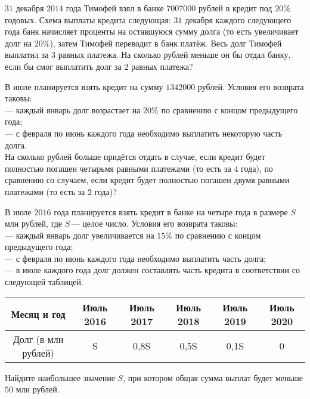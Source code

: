 \begin{homework}[number=3]
	\begin{listofex}
		\item \( 31 \) декабря \( 2014 \) года Тимофей взял в банке \( 7 007 000  \) рублей в кредит под \( 20\% \) годовых. Схема выплаты кредита следующая: \( 31 \) декабря каждого следующего года банк начисляет проценты на оставшуюся сумму долга (то есть увеличивает долг на \( 20\% \)), затем Тимофей переводит в банк платёж. Весь долг Тимофей выплатил за \( 3 \) равных платежа. На сколько рублей меньше он бы отдал банку, если бы смог выплатить долг за \( 2 \) равных платежа?
		\item В июле планируется взять кредит на сумму \( 1 342 000 \) рублей. Условия его возврата таковы:\\
		--- каждый январь долг возрастает на \( 20\% \) по сравнению с концом предыдущего года;\\		
		--- с февраля по июнь каждого года необходимо выплатить некоторую часть долга.\\		
		На сколько рублей больше придётся отдать в случае, если кредит будет полностью погашен четырьмя равными платежами (то есть за \( 4 \) года), по сравнению со случаем, если кредит будет полностью погашен двумя равными платежами (то есть за \( 2 \) года)?
		\item В июле \( 2016 \) года планируется взять кредит в банке на четыре года в размере \( S \) млн рублей, где \( S \) --- целое число. Условия его возврата таковы:\\		
		--- каждый январь долг увеличивается на \( 15\% \) по сравнению с концом предыдущего года;\\		
		--- с февраля по июнь каждого года необходимо выплатить часть долга;\\		
		--- в июле каждого года долг должен составлять часть кредита в соответствии со следующей таблицей.
		\begin{table}[h]
			\begin{tabular}{llllll}
				\hline
				\multicolumn{1}{|c|}{Месяц и год}         & \multicolumn{1}{c|}{Июль 2016} & \multicolumn{1}{c|}{Июль 2017} & \multicolumn{1}{c|}{Июль 2018} & \multicolumn{1}{c|}{Июль 2019} & \multicolumn{1}{c|}{Июль 2020} \\ \hline
				\multicolumn{1}{|c|}{Долг (в млн рублей)} & \multicolumn{1}{c|}{S}         & \multicolumn{1}{c|}{0,8S}      & \multicolumn{1}{c|}{0,5S}      & \multicolumn{1}{c|}{0,1S}      & \multicolumn{1}{c|}{0}         \\ \hline
			\end{tabular}
		\end{table}
		Найдите наибольшее значение \( S \), при котором общая сумма выплат будет меньше \( 50 \) млн рублей.
	\end{listofex}
\end{homework}

